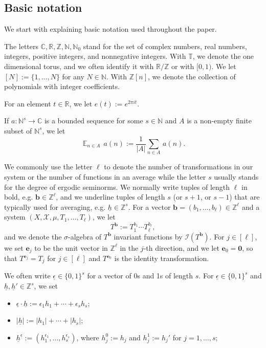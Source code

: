 \documentclass[11pt]{amsart}
\theoremstyle{definition}
\newcommand{\C}{{\mathbb C}}
\newcommand{\N}{{\mathbb N}}
\newcommand{\R}{{\mathbb R}}
\newcommand{\T}{{\mathbb T}}
\newcommand{\Z}{{\mathbb Z}}
\newcommand{\CI}{{\mathcal I}}
\newcommand{\CX}{{\mathcal X}}
\newcommand{\be}{{\mathbf{e}}}
\renewcommand{\b}{{\textbf{b}}}
\newcommand{\uh}{{\underline{h}}}
\newcommand{\eps}{\epsilon}
\newcommand{\ueps}{{\underline{\epsilon}}}
\DeclareMathOperator*{\E}{\mathbb{E}}
\newcommand{\abs}[1]{\mathopen{}\left| #1\mathclose{}\right|}
\begin{document}
\subsection{Basic notation}\label{SS:notation}
We start with explaining basic notation used throughout the paper.

The letters $\C, \R, \Z, \N, \N_0$ stand for the set of complex numbers, real numbers, integers, positive integers, and nonnegative integers.    With $\T$, we denote the one dimensional torus, and we often identify it with $\R/\Z$ or  with $[0,1)$. We let $[N]:=\{1, \ldots, N\}$ for any $N\in\N$.  With $\Z[n]$, we denote the collection of polynomials with integer coefficients.


For an element $t\in \R$, we let $e(t):=e^{2\pi i t}$.


  If $a\colon \N^s\to \C$ is a  bounded sequence for some $s\in \N$ and $A$ is a non-empty finite subset of $\N^s$,  we let
  $$
  \E_{n\in A}\,a(n):=\frac{1}{|A|}\sum_{n\in A}\, a(n).
  $$

  We commonly use the letter $\ell$ to denote the number of transformations in our system or the number of functions in an average while the letter $s$ usually stands for the degree of ergodic seminorms. We normally write  tuples of length $\ell$ in bold, e.g. $\b\in\Z^\ell$, and we underline tuples of length $s$ (or $s+1$, or $s-1$) that are typically used for averaging, e.g. $\uh\in\Z^s$. For a vector $\b=(b_1,\ldots, b_\ell)\in \Z^\ell$ and a system $(X, \CX, \mu, T_1, \ldots, T_\ell)$, we let
 $$
 T^{\b}:=T_1^{b_1}\cdots T_\ell^{b_\ell},
 $$
 and we denote the $\sigma$-algebra of $T^\b$ invariant functions by $\CI(T^\b)$.
For $j\in[\ell]$, we set $\be_j$ to be the unit vector in $\Z^\ell$ in the $j$-th direction, and we let $\be_0 = \mathbf{0}$, so that $T^{\be_j} = T_j$ for $j\in[\ell]$ and $T^{\be_0}$ is the identity transformation.

We often write $\ueps\in\{0,1\}^s$ for a vector of 0s and 1s of length $s$. For $\ueps\in\{0,1\}^s$ and $\uh, \uh'\in\Z^s$, we set
\begin{itemize}
    \item $\ueps\cdot \uh:=\eps_1 h_1+\cdots+ \eps_s h_s$;
    \item $\abs{\uh} := |h_1|+\cdots+|h_s|$;
    \item $\uh^\ueps := (h_1^{\eps_1}, \ldots, h_s^{\eps_s})$, where $h_j^0:=h_j$ and $h_j^1:=h_j'$ for $j=1,\ldots, s$;
\end{itemize}
\end{document}
